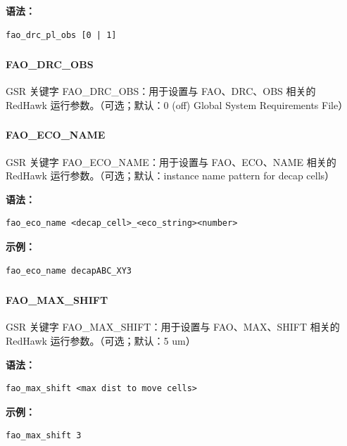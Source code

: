 \textbf{语法：}
\begin{lstlisting}
fao_drc_pl_obs [0 | 1]
\end{lstlisting}

\subsubsection{}
\paragraph*{FAO_DRC_OBS}

GSR 关键字 FAO_DRC_OBS：用于设置与 FAO、DRC、OBS 相关的 RedHawk 运行参数。（可选；默认：0 (off) Global System Requirements File）

\subsubsection{}
\paragraph*{FAO_ECO_NAME}

GSR 关键字 FAO_ECO_NAME：用于设置与 FAO、ECO、NAME 相关的 RedHawk 运行参数。（可选；默认：instance name pattern for decap cells）

\textbf{语法：}
\begin{lstlisting}
fao_eco_name <decap_cell>_<eco_string><number>
\end{lstlisting}

\textbf{示例：}
\begin{lstlisting}
fao_eco_name decapABC_XY3
\end{lstlisting}

\subsubsection{}
\paragraph*{FAO_MAX_SHIFT}

GSR 关键字 FAO_MAX_SHIFT：用于设置与 FAO、MAX、SHIFT 相关的 RedHawk 运行参数。（可选；默认：5 um）

\textbf{语法：}
\begin{lstlisting}
fao_max_shift <max dist to move cells>
\end{lstlisting}

\textbf{示例：}
\begin{lstlisting}
fao_max_shift 3
\end{lstlisting}

